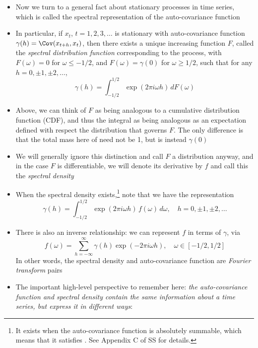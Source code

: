 \documentclass{article}
\begin{document}
\begin{itemize}
\item Now we turn to a general fact about stationary processes in time series,
  which is called the spectral representation of the auto-covariance function 

\item In particular, if $x_t$, $t = 1,2,3,\dots$ is stationary with
  auto-covariance function $\gamma(h) = \Cov(x_{t+h}, x_t)$, then there exists a 
  unique increasing function $F$, called the \emph{spectral distribution
    function} corresponding to the process, with $F(\omega) = 0$ for $\omega
  \leq -1/2$, and $F(\omega) = \gamma(0)$ for $\omega \geq 1/2$, such that for
  any $h = 0, \pm 1, \pm 2, \dots$,  
  \[
  \gamma(h) = \int_{-1/2}^{1/2} \exp(2\pi i \omega h) \, dF(\omega) 
  \]

\item Above, we can think of $F$ as being analogous to a cumulative distribution
  function (CDF), and thus the integral as being analogous as an expectation
  defined with respect the distribution that governs $F$. The only difference is
  that the total mass here of need not be 1, but is instead $\gamma(0)$ 

\item We will generally ignore this distinction and call $F$ a distribution
  anyway, and in the case $F$ is differentiable, we will denote its derivative
  by $f$ and call this the \emph{spectral density}

\item When the spectral density exists,\footnote{It exists when the
    auto-covariance function is absolutely summable, which means that it
    satisfies . See
    Appendix C of SS for details.} 
  note that we have the representation 
  \[
  \gamma(h) = \int_{-1/2}^{1/2} \exp(2\pi i \omega h) \, f(\omega) \, d\omega,
  \quad h = 0, \pm 1, \pm 2, \dots
  \]

\item There is also an inverse relationship: we can represent $f$ in terms of
  $\gamma$, via 
  \begin{equation}
  \label{eq:spectral_density}
  f(\omega) = \sum_{h=-\infty}^\infty \gamma(h) \exp(-2\pi i \omega h), \quad
  \omega \in [-1/2, 1/2] 
  \end{equation}
  In other words, the spectral density and auto-covariance function are
  \emph{Fourier transform} pairs

\item The important high-level perspective to remember here: \emph{the
    auto-covariance function and spectral density contain the same information 
    about a time series, but express it in different ways}:


\end{itemize}
\end{document}
